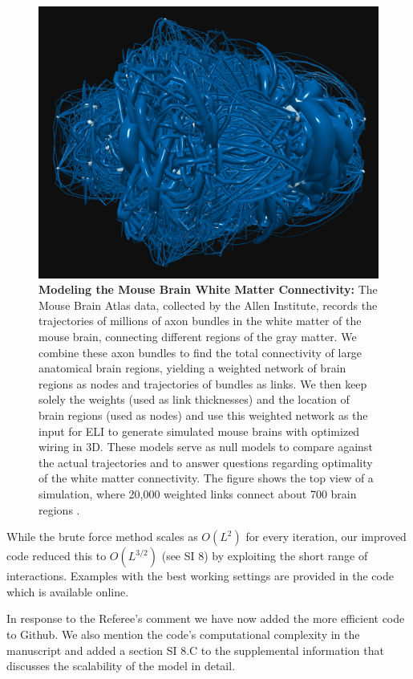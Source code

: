 \documentclass[11pt]{article}
\begin{document}
\begin{response}
\begin{figure}[ht]
    \centering
    \includegraphics[width=.6\textwidth]{fig-09-19/mouse-brain-20k-top.png}
    \caption{
    \scriptsize
    {\bf Modeling the Mouse Brain White Matter Connectivity:} 
    The Mouse Brain Atlas data, collected by the Allen Institute, records the trajectories of millions of axon bundles in the white matter of the mouse brain, connecting different regions of the gray matter. 
    We combine these axon bundles to find the total connectivity of large anatomical brain regions, yielding a weighted network of brain regions as nodes and trajectories of bundles as links. 
    We then keep solely the weights (used as link thicknesses) and the location of brain regions (used as nodes) and
    use this weighted network as the input for ELI to generate simulated mouse brains with optimized wiring in 3D. 
    These models serve as null models to compare against the actual trajectories and to answer questions regarding optimality of the white matter connectivity. 
    The figure shows the top view of a simulation, where 20,000 weighted links connect about 700 brain regions . %
    }
    \label{fig:brain}
\end{figure}

While the brute force method scales as $O(L^2)$ for every iteration, our improved code reduced this to $O(L^{3/2})$ ({see SI 8}) by exploiting the short range of interactions. 
Examples with the best working settings are provided in the code which is available online. 

In response to the Referee's comment we have now added the more efficient code to Github. %
We also mention the code's computational complexity in the manuscript and added a section SI 8.C to the supplemental information that discusses the scalability of the model in detail.
\end{response}
\end{document}
